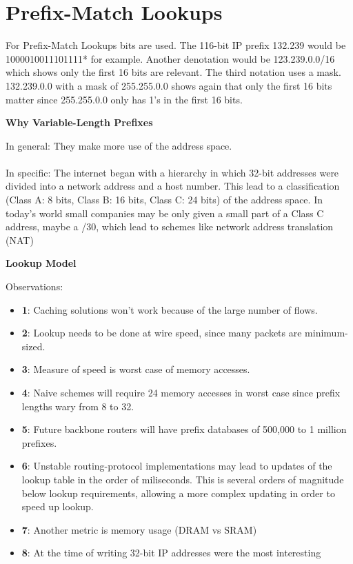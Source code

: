 \chapter{Prefix-Match Lookups} \label{CHAP:PREFMATCH}

For Prefix-Match Lookups bits are used. The 116-bit IP prefix 132.239 would be 1000010011101111* for example. Another denotation would be 123.239.0.0/16 which shows only the first 16 bits are relevant. The third notation uses a mask. 132.239.0.0 with a mask of 255.255.0.0 shows again that only the first 16 bits matter since 255.255.0.0 only has 1's in the first 16 bits.

\textbf{Why Variable-Length Prefixes}

In general: They make more use of the address space.\\
\\
In specific: The internet began with a hierarchy in which 32-bit addresses were divided into a network address and a host number. This lead to a classification (Class A: 8 bits, Class B: 16 bits, Class C: 24 bits) of the address space. In today's world small companies may be only given a small part of a Class C address, maybe a /30, which lead to schemes like network address translation (NAT)

\textbf{Lookup Model}

Observations:
\begin{itemize}
\item \textbf{1}: Caching solutions won't work because of the large number of flows.
\item \textbf{2}: Lookup needs to be done at wire speed, since many packets are minimum-sized.
\item \textbf{3}: Measure of speed is worst case of memory accesses.
\item \textbf{4}: Naive schemes will require 24 memory accesses in worst case since prefix lengths wary from 8 to 32.
\item \textbf{5}: Future backbone routers will have prefix databases of 500,000 to 1 million prefixes.
\item \textbf{6}: Unstable routing-protocol implementations may lead to updates of the lookup table in the order of miliseconds. This is several orders of magnitude below lookup requirements, allowing a more complex updating in order to speed up lookup.
\item \textbf{7}: Another metric is memory usage (DRAM vs SRAM)
\item \textbf{8}: At the time of writing 32-bit IP addresses were the most interesting
\end{itemize}

